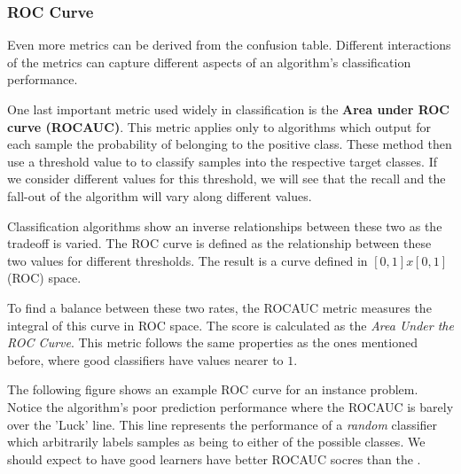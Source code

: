 \subsubsection{ROC Curve}

Even more metrics can be derived from the confusion table. Different interactions of the metrics can capture different aspects of an algorithm's classification performance. 

One last important metric used widely in classification is the  \textbf{Area under ROC curve (ROCAUC)}. This metric applies only to algorithms which output for each sample  the probability of belonging to the positive class.  These method then use a threshold value to to classify samples into the respective target classes. If we consider different values for this threshold, we will see that the recall and the fall-out of the algorithm will vary along different values. 

Classification algorithms show an inverse relationships between these two as the tradeoff is varied. The ROC curve is defined as the relationship between these two values for different thresholds. The result is a curve defined in $[0,1]x[0,1]$ (ROC) space.

To find a balance between these two rates, the ROCAUC metric measures the integral of this curve in ROC space. The score is calculated as the \textit{Area Under the ROC Curve}. This metric follows the same properties as the ones mentioned before, where good classifiers have values nearer to $1$. 

The following figure shows an example ROC curve for an instance problem. Notice the algorithm's poor prediction performance where the ROCAUC is barely over the 'Luck' line. This line represents the performance of a \textit{random} classifier which arbitrarily labels samples as being to either of the possible classes. We should expect to have good learners have better ROCAUC socres than the . 